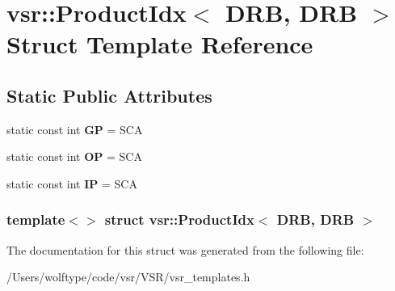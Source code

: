 \hypertarget{structvsr_1_1_product_idx_3_01_d_r_b_00_01_d_r_b_01_4}{\section{vsr\-:\-:Product\-Idx$<$ D\-R\-B, D\-R\-B $>$ Struct Template Reference}
\label{structvsr_1_1_product_idx_3_01_d_r_b_00_01_d_r_b_01_4}
}
\subsection*{Static Public Attributes}
\begin{DoxyCompactItemize}
\item 
\hypertarget{structvsr_1_1_product_idx_3_01_d_r_b_00_01_d_r_b_01_4_a774817d0aee1b4a6ded7e91b555d80fc}{static const int {\bfseries G\-P} = S\-C\-A}\label{structvsr_1_1_product_idx_3_01_d_r_b_00_01_d_r_b_01_4_a774817d0aee1b4a6ded7e91b555d80fc}

\item 
\hypertarget{structvsr_1_1_product_idx_3_01_d_r_b_00_01_d_r_b_01_4_af09cc8027d0d8459637483ff7a477208}{static const int {\bfseries O\-P} = S\-C\-A}\label{structvsr_1_1_product_idx_3_01_d_r_b_00_01_d_r_b_01_4_af09cc8027d0d8459637483ff7a477208}

\item 
\hypertarget{structvsr_1_1_product_idx_3_01_d_r_b_00_01_d_r_b_01_4_ab53a3eb0aa34fa6f3822d6fed1d5abfa}{static const int {\bfseries I\-P} = S\-C\-A}\label{structvsr_1_1_product_idx_3_01_d_r_b_00_01_d_r_b_01_4_ab53a3eb0aa34fa6f3822d6fed1d5abfa}

\end{DoxyCompactItemize}
\subsubsection*{template$<$$>$ struct vsr\-::\-Product\-Idx$<$ D\-R\-B, D\-R\-B $>$}



The documentation for this struct was generated from the following file\-:\begin{DoxyCompactItemize}
\item 
/\-Users/wolftype/code/vsr/\-V\-S\-R/vsr\-\_\-templates.\-h\end{DoxyCompactItemize}

